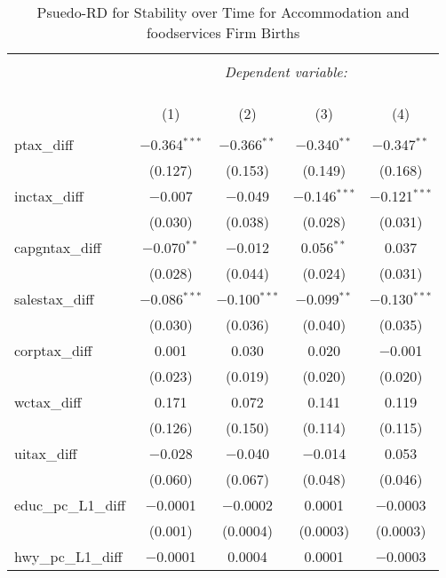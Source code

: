
\begin{table}[!htbp] \centering 
  \caption{Psuedo-RD for Stability over Time for  Accommodation and foodservices Firm Births} 
  \label{} 
\begin{tabular}{@{\extracolsep{5pt}}lcccc} 
\\[-1.8ex]\hline 
\hline \\[-1.8ex] 
 & \multicolumn{4}{c}{\textit{Dependent variable:}} \\ 
\cline{2-5} 
\\[-1.8ex] & \multicolumn{4}{c}{ } \\ 
\\[-1.8ex] & (1) & (2) & (3) & (4)\\ 
\hline \\[-1.8ex] 
 ptax\_diff & $-$0.364$^{***}$ & $-$0.366$^{**}$ & $-$0.340$^{**}$ & $-$0.347$^{**}$ \\ 
  & (0.127) & (0.153) & (0.149) & (0.168) \\ 
  inctax\_diff & $-$0.007 & $-$0.049 & $-$0.146$^{***}$ & $-$0.121$^{***}$ \\ 
  & (0.030) & (0.038) & (0.028) & (0.031) \\ 
  capgntax\_diff & $-$0.070$^{**}$ & $-$0.012 & 0.056$^{**}$ & 0.037 \\ 
  & (0.028) & (0.044) & (0.024) & (0.031) \\ 
  salestax\_diff & $-$0.086$^{***}$ & $-$0.100$^{***}$ & $-$0.099$^{**}$ & $-$0.130$^{***}$ \\ 
  & (0.030) & (0.036) & (0.040) & (0.035) \\ 
  corptax\_diff & 0.001 & 0.030 & 0.020 & $-$0.001 \\ 
  & (0.023) & (0.019) & (0.020) & (0.020) \\ 
  wctax\_diff & 0.171 & 0.072 & 0.141 & 0.119 \\ 
  & (0.126) & (0.150) & (0.114) & (0.115) \\ 
  uitax\_diff & $-$0.028 & $-$0.040 & $-$0.014 & 0.053 \\ 
  & (0.060) & (0.067) & (0.048) & (0.046) \\ 
  educ\_pc\_L1\_diff & $-$0.0001 & $-$0.0002 & 0.0001 & $-$0.0003 \\ 
  & (0.001) & (0.0004) & (0.0003) & (0.0003) \\ 
  hwy\_pc\_L1\_diff & $-$0.0001 & 0.0004 & 0.0001 & $-$0.0003 \\ 

\end{tabular}
\end{table}
